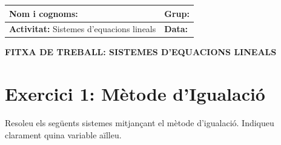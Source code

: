 \documentclass[12pt,a4paper]{article}
\begin{document}
\begingroup
\renewcommand{\arraystretch}{2.2}
\begin{tabularx}{\textwidth}{|X|p{4cm}|}
    \hline
    \textbf{Nom i cognoms:} & \textbf{Grup:} \\ \hline
    \textbf{Activitat:} Sistemes d'equacions lineals & \textbf{Data:} \\ \hline
\end{tabularx}
\endgroup

\vspace{0.8cm}

\begin{center}
    {\Large \textbf{FITXA DE TREBALL: SISTEMES D'EQUACIONS LINEALS}}
\end{center}

\section*{Exercici 1: Mètode d'Igualació}
Resoleu els següents sistemes mitjançant el mètode d'igualació. Indiqueu clarament quina variable aïlleu.
\end{document}
